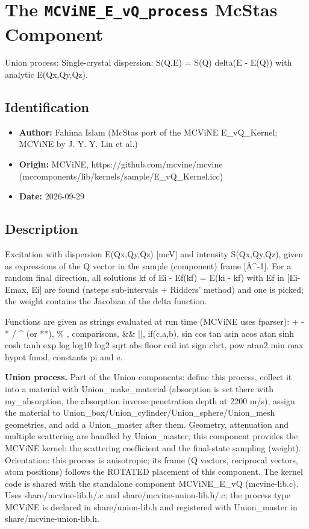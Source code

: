 \section{The \texttt{MCViNE\_E\_vQ\_process} McStas Component}
Union process: Single-crystal dispersion: S(Q,E) = S(Q) delta(E - E(Q)) with analytic E(Qx,Qy,Qz).

\subsection*{Identification}
\begin{itemize}
  \item \textbf{Author:} Fahima Islam (McStas port of the MCViNE E\_vQ\_Kernel; MCViNE by J. Y. Y. Lin et al.)
  \item \textbf{Origin:} MCViNE, https://github.com/mcvine/mcvine (mccomponents/lib/kernels/sample/E\_vQ\_Kernel.icc)
  \item \textbf{Date:} 2026-09-29
\end{itemize}

\subsection*{Description}
Excitation with dispersion E(Qx,Qy,Qz) [meV] and intensity S(Qx,Qy,Qz), given as expressions of the Q vector in the sample (component) frame [\AA{}\textasciicircum{}-1]. For a random final direction, all solutions kf of Ei - Ef(kf) = E(ki - kf) with Ef in [Ei-Emax, Ei] are found (nsteps sub-intervals + Ridders' method) and one is picked; the weight contains the Jacobian of the delta function.

Functions are given as strings evaluated at run time (MCViNE uses fparser): + - * / \textasciicircum{} (or **), \% , comparisons, \&\& ||, if(c,a,b), sin cos tan asin acos atan sinh cosh tanh exp log log10 log2 sqrt abs floor ceil int sign cbrt, pow atan2 min max hypot fmod, constants pi and e.

\textbf{Union process.} Part of the Union components: define this process, collect it into a material with Union\_make\_material (absorption is set there with my\_absorption, the absorption inverse penetration depth at 2200 m/s), assign the material to Union\_box/Union\_cylinder/Union\_sphere/Union\_mesh geometries, and add a Union\_master after them. Geometry, attenuation and multiple scattering are handled by Union\_master; this component provides the MCViNE kernel: the scattering coefficient and the final-state sampling (weight). Orientation: this process is anisotropic; its frame (Q vectors, reciprocal vectors, atom positions) follows the ROTATED placement of this component. The kernel code is shared with the standalone component MCViNE\_E\_vQ (mcvine-lib.c). Uses share/mcvine-lib.h/.c and share/mcvine-union-lib.h/.c; the process type MCViNE is declared in share/union-lib.h and registered with Union\_master in share/mcvine-union-lib.h.

